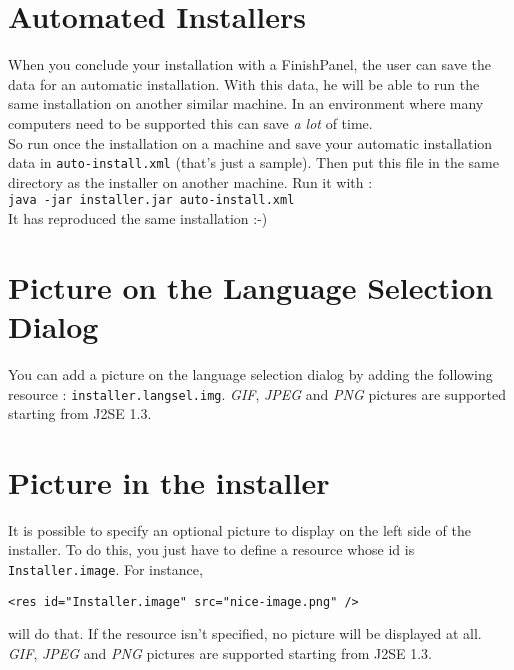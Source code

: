 \section{Automated Installers}

When you conclude your installation with a FinishPanel, the user can
save the data for an automatic installation. With this data, he will be
able to run the same installation on another similar machine. In an
environment where many computers need to be supported this can save
\textsl{a lot} of time.\\

So run once the installation on a machine and save your automatic installation
data in \texttt{auto-install.xml} (that's just a sample). Then put this file in
the same directory as the installer on another machine. Run it with :\\
\texttt{java -jar installer.jar auto-install.xml}\\

It has reproduced the same installation :-)\\

\section{Picture on the Language Selection Dialog}

You can add a picture on the language selection dialog by adding the following
resource : \texttt{installer.langsel.img}. \textsl{GIF}, \textsl{JPEG} and
\textsl{PNG} pictures are supported starting from J2SE 1.3.\\

\section{Picture in the installer}

It is possible to specify an optional picture to display on the left side of the
installer. To do this, you just have to define a resource whose id is
\texttt{Installer.image}. For instance,
\begin{verbatim}
<res id="Installer.image" src="nice-image.png" />
\end{verbatim}
will do that. If the resource isn't specified, no picture will be displayed at
all. \textsl{GIF}, \textsl{JPEG} and
\textsl{PNG} pictures are supported starting from J2SE 1.3.\\

